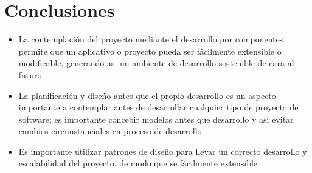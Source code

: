 \chapter{Conclusiones}
\begin{itemize}
\item{La contemplación del proyecto mediante el desarrollo por componentes permite que un aplicativo o proyecto
pueda ser fácilmente extensible o modificable, generando asi un ambiente de desarrollo sostenible de cara al futuro}
\item{La planificación y diseño antes que el propio desarrollo es un aspecto importante a contemplar antes de desarrollar cualquier tipo de proyecto de software; es importante concebir modelos antes que desarrollo y asi evitar cambios circunstanciales en proceso de desarrollo}
\item{Es importante utilizar patrones de diseño para llevar un correcto desarrollo y escalabilidad del proyecto, de modo que se fácilmente extensible}
\end{itemize}